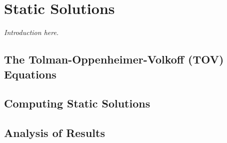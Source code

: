 \chapter{Static Solutions}

\textit{Introduction here.}

\section{The Tolman-Oppenheimer-Volkoff (TOV) Equations}

\section{Computing Static Solutions}

\section{Analysis of Results}
